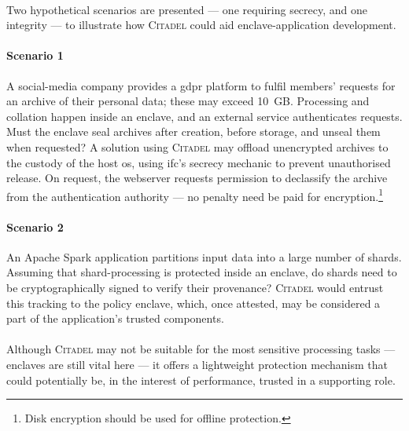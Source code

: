 \paragraph{} Two hypothetical scenarios are presented --- one requiring secrecy, and one integrity --- to illustrate how \textsc{Citadel} could aid enclave-application development.

\paragraph{Scenario 1} A social-media company provides a \acrshort{gdpr} platform to fulfil members' requests for an archive of their personal data; these may exceed 10~GB. Processing and collation happen inside an enclave, and an external service authenticates requests. Must the enclave seal archives after creation, before storage, and unseal them when requested? A solution using \textsc{Citadel} may offload unencrypted archives to the custody of the host \acrshort{os}, using \acrshort{ifc}'s secrecy mechanic to prevent unauthorised release. On request, the webserver requests permission to declassify the archive from the authentication authority --- no penalty need be paid for encryption.\footnote{Disk encryption should be used for offline protection.}


\paragraph{Scenario 2} An Apache Spark application partitions input data into a large number of shards. Assuming that shard-processing is protected inside an enclave, do shards need to be cryptographically signed to verify their provenance? \textsc{Citadel} would entrust this tracking to the policy enclave, which, once attested, may be considered a part of the application's trusted components.

\paragraph{} Although \textsc{Citadel} may not be suitable for the most sensitive processing tasks --- enclaves are still vital here --- it offers a lightweight protection mechanism that could potentially be, in the interest of performance, trusted in a supporting role.
